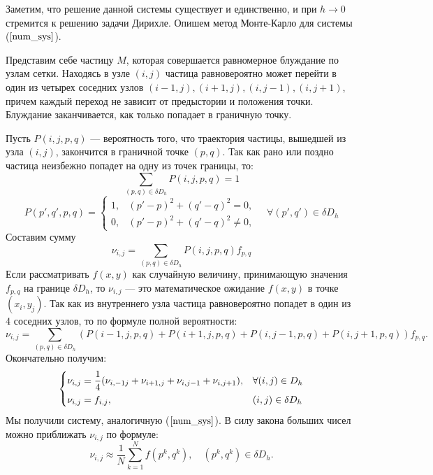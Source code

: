 \documentclass[oneside, final, 12pt]{article}
\begin{document}
	Заметим, что решение данной системы существует и единственно, и при $h\rightarrow 0$ стремится 
	к решению задачи Дирихле. Опишем метод Монте-Карло для системы ($\ref{num_sys}$).
	
	Представим себе частицу $M$, которая совершается равномерное блуждание по узлам сетки. 
	Находясь в узле $(i, j)$ частица равновероятно может перейти  в один из 
	четырех соседних узлов $(i -1,j), (i +1, j), (i, j-1), (i, j+1)$, причем каждый переход не зависит
	от предыстории и положения точки. Блуждание заканчивается, как только попадает в граничную точку.
	
	Пусть $P(i,j,p,q)$ --- вероятность того, что траектория частицы, вышедшей из узла $(i,j)$, закончится в 
	граничной точке $(p,q)$. Так как рано или поздно частица неизбежно попадет на одну из точек границы,
	то: 
	$$
		\sum\limits_{(p,q)\in \delta D_h} P(i,j,p,q) = 1 
	$$
	$$  P(p',q',p,q) = 	\begin{cases}
										1,& (p'-p)^2+(q'-q)^2 = 0,\\
										0, & (p'-p)^2+(q'-q)^2 \neq 0,
								\end{cases} \quad
		\forall (p',q') \in \delta D_h 
	$$
	\newpage
	Составим сумму 
	$$
		\nu_{i,j} = \sum\limits_{(p,q)\in \delta D_h} P(i,j,p,q) f_{p,q}
	$$
	Если рассматривать $f(x,y)$ как случайную величину, принимающую значения $f_{p,q}$  на границе
	$\delta D_h$, то $\nu_{i,j}$ --- это математическое ожидание $f(x,y)$ в точке $(x_i,y_j)$. 
	Так как из внутреннего узла частица равновероятно попадет в один из 4 соседних узлов, 
	то по формуле полной вероятности:
	\begin{equation}
		\nu_{i,j} = \sum\limits_{(p,q)\in \delta D_h}  (P(i-1,j,p,q)+P(i+1,j,p,q)+P(i,j-1,p,q)+P(i,j+1,p,q))f_{p,q}.
		\label{t_8}
	\end{equation}
	Окончательно получим:
	\begin{equation}
		\begin{cases}
			\nu_{i,j} = \dfrac{1}{4} (\nu_{i,-1j}+\nu_{i+1,j}+\nu_{i,j-1} +\nu_{i,j+1}), 
								& \forall (i,j) \in D_h \vspace{1mm} \\
			\nu_{i,j} = f_{i,j}, & (i,j) \in \delta D_h
		\end{cases} \label{num_sys_2}
	\end{equation}
	Мы получили систему, аналогичную ($\ref{num_sys}$). 
	В силу закона больших чисел можно приближать $\nu_{i,j}$ по формуле:
	\begin{equation}
		\nu_{i,j} \approx \dfrac{1}{N} \sum\limits_{k=1} ^N f(p^{k},q^{k}), \quad (p^k,q^k)\in \delta D_h.
		\label{approx_8}
	\end{equation}
	
\end{document}
